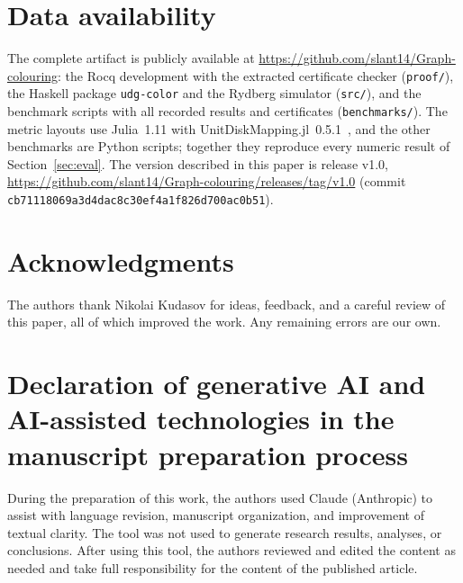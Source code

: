 \documentclass[a4paper,fleqn]{cas-sc}
\begin{document}
\section*{Data availability}
The complete artifact is publicly available at
\url{https://github.com/slant14/Graph-colouring}: the Rocq development with the
extracted certificate checker (\texttt{proof/}), the Haskell package \texttt{udg-color}
and the Rydberg simulator (\texttt{src/}), and the benchmark scripts with all recorded
results and certificates (\texttt{benchmarks/}). The metric layouts use Julia~1.11 with
UnitDiskMapping.jl~0.5.1~\cite{UnitDiskMapping}, and the other benchmarks are Python
scripts; together they reproduce every numeric result of Section~\ref{sec:eval}. The
version described in this paper is release v1.0,
\url{https://github.com/slant14/Graph-colouring/releases/tag/v1.0} (commit
\texttt{cb71118069a3d4dac8c30ef4a1f826d700ac0b51}).


\section*{Acknowledgments}
The authors thank Nikolai Kudasov for ideas, feedback, and a careful review of this paper, all of which improved the
work. Any remaining errors are our own.

\section*{Declaration of generative AI and AI-assisted technologies in the manuscript preparation process}
During the preparation of this work, the authors used Claude (Anthropic) to
assist with language revision, manuscript organization, and improvement of textual
clarity. The tool was not used to generate research results, analyses, or
conclusions. After using this tool, the authors reviewed and edited the content as
needed and take full responsibility for the content of the published article.




\end{document}
